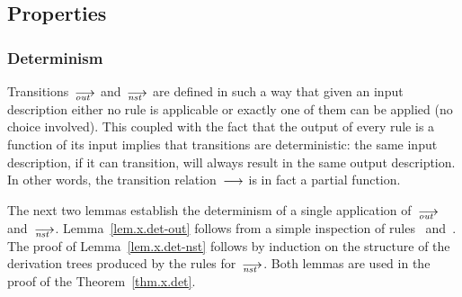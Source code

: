 

\subsection{Properties}
\label{sec.sem.props}


\subsubsection{Determinism}

Transitions~$\out$ and~$\nst$ are defined in such a way that given an input
description either no rule is applicable or exactly one of them can be
applied (no choice involved).  This coupled with the fact that the output of
every rule is a function of its input implies that transitions are
deterministic: the same input description, if it can transition, will always
result in the same output description.  In other words, the transition
relation~$\trans$ is in fact a partial function.

The next two lemmas establish the determinism of a single application
of~$\out$ and~$\nst$.  Lemma~\ref{lem.x.det-out} follows from a simple
inspection of rules~ and~.  The proof of
Lemma~\ref{lem.x.det-nst} follows by induction on the structure of the
derivation trees produced by the rules for~$\nst$.  Both lemmas are used in
the proof of the Theorem~\ref{thm.x.det}.

